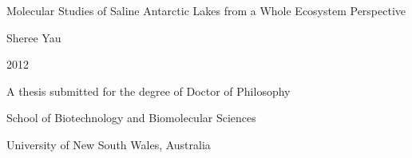 \begin{titlepage}
\begin{center}
\vspace*{1in}
\LARGE{Molecular Studies of Saline Antarctic Lakes from a Whole Ecosystem Perspective}
\par
\vspace{1.5in}
\large{Sheree Yau}
\par
\vspace{0.5in}
\large{2012}
\par
\vfill
A thesis submitted for the degree of Doctor of Philosophy
\par
\vspace{0.5in}
School of Biotechnology and Biomolecular Sciences
\par
University of New South Wales, Australia
\par
\vspace{0.5in}
\end{center}
\end{titlepage}
